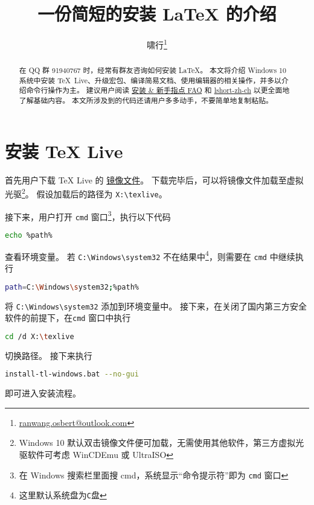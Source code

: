 \documentclass{ctexart}
\title{\bfseries 一份简短的安装 \LaTeX{} 的介绍}
\author{啸行\thanks{\url{ranwang.osbert@outlook.com}}}
\begin{document}
  
\maketitle

\begin{abstract}
在 QQ 群 91940767 时，经常有群友咨询如何安装 \LaTeX{}。
本文将介绍 Windows 10 系统中安装 \TeX{}~Live、升级宏包、编译简易文档、使用编辑器的相关操作，并多以介绍命令行操作为主。
建议用户阅读 \href{http://www.latexstudio.net/archives/11469.html}{\LaTeXe{} 安装 \& 新手指点 FAQ} 和 \href{http://mirrors.ctan.org/info/lshort/chinese/lshort-zh-cn.pdf}{lshort-zh-ch} 以更全面地了解基础内容。
本文所涉及到的代码还请用户多多动手，不要简单地复制粘贴。
\end{abstract}

\section{安装 \TeX{} Live}
首先用户下载 \TeX{} Live 的 \href{http://mirrors.ctan.org/systems/texlive/Images/texlive.iso}{镜像文件}。
下载完毕后，可以将镜像文件加载至虚拟光驱\footnote{Windows 10 默认双击镜像文件便可加载，无需使用其他软件，第三方虚拟光驱软件可考虑 WinCDEmu 或 UltraISO}。
假设加载后的路径为 \texttt{X:\textbackslash texlive}。

接下来，用户打开 \texttt{cmd} 窗口\footnote{在 Windows 搜索栏里面搜 cmd，系统显示“命令提示符”即为 \texttt{cmd} 窗口}，执行以下代码
\begin{lstlisting}[language = bash]
  echo %path%
\end{lstlisting}
查看环境变量。
若 \texttt{C:\textbackslash Windows\textbackslash system32} 不在结果中\footnote{这里默认系统盘为\texttt{C}盘}，则需要在 \texttt{cmd} 中继续执行
\begin{lstlisting}[language = bash]
  path=C:\Windows\system32;%path%
\end{lstlisting}
将 \verb|C:\Windows\system32| 添加到环境变量中。
接下来，在关闭了国内第三方安全软件的前提下，在\texttt{cmd} 窗口中执行
\begin{lstlisting}[language = bash]
  cd /d X:\texlive
\end{lstlisting}
切换路径。
接下来执行
\begin{lstlisting}[language = bash]
  install-tl-windows.bat --no-gui
\end{lstlisting}
即可进入安装流程。
\end{document}
